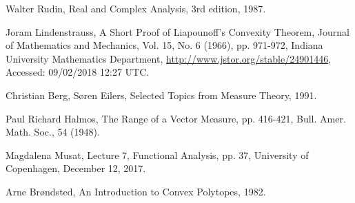\begin{thebibliography}{9}

	Walter Rudin,
	Real and Complex Analysis,
	3rd edition,
	1987.
	
	Joram Lindenstrauss,
	A Short Proof of Liapounoff's Convexity Theorem,
	Journal of Mathematics and Mechanics, Vol. 15, No. 6 (1966), pp. 971-972,
	Indiana University Mathematics Department,
	\url{http://www.jstor.org/stable/24901446},
	Accessed: 09/02/2018 12:27 UTC.
	
	Christian Berg, Søren Eilers,
	Selected Topics from Measure Theory,
	1991.
	
	Paul Richard Halmos,
	The Range of a Vector Measure, pp. 416-421,
	Bull. Amer. Math. Soc., 54 (1948).

	Magdalena Musat,
	Lecture 7, Functional Analysis, pp. 37,
	University of Copenhagen,
	December 12, 2017.
	
	Arne Brøndsted,
	An Introduction to Convex Polytopes,
	1982.

\end{thebibliography}